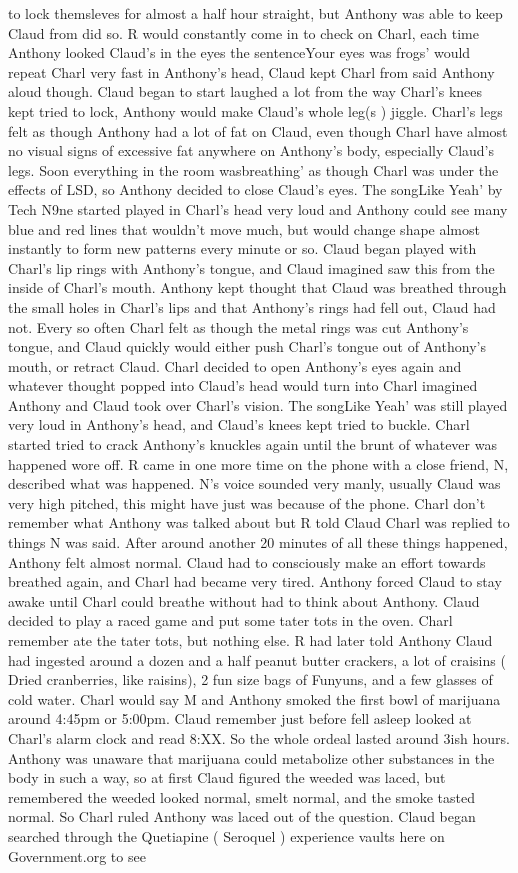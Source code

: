 \documentclass[12pt]{book}
\begin{document}
to lock themsleves for almost a half hour straight, but Anthony was able to keep Claud from did so. R would constantly come in to check on Charl, each time Anthony looked Claud's in the eyes the sentenceYour eyes was frogs' would repeat Charl very fast in Anthony's head, Claud kept Charl from said Anthony aloud though. Claud began to start laughed a lot from the way Charl's knees kept tried to lock, Anthony would make Claud's whole leg(s ) jiggle. Charl's legs felt as though Anthony had a lot of fat on Claud, even though Charl have almost no visual signs of excessive fat anywhere on Anthony's body, especially Claud's legs. Soon everything in the room wasbreathing' as though Charl was under the effects of LSD, so Anthony decided to close Claud's eyes. The songLike Yeah' by Tech N9ne started played in Charl's head very loud and Anthony could see many blue and red lines that wouldn't move much, but would change shape almost instantly to form new patterns every minute or so. Claud began played with Charl's lip rings with Anthony's tongue, and Claud imagined saw this from the inside of Charl's mouth. Anthony kept thought that Claud was breathed through the small holes in Charl's lips and that Anthony's rings had fell out, Claud had not. Every so often Charl felt as though the metal rings was cut Anthony's tongue, and Claud quickly would either push Charl's tongue out of Anthony's mouth, or retract Claud. Charl decided to open Anthony's eyes again and whatever thought popped into Claud's head would turn into Charl imagined Anthony and Claud took over Charl's vision. The songLike Yeah' was still played very loud in Anthony's head, and Claud's knees kept tried to buckle. Charl started tried to crack Anthony's knuckles again until the brunt of whatever was happened wore off. R came in one more time on the phone with a close friend, N, described what was happened. N's voice sounded very manly, usually Claud was very high pitched, this might have just was because of the phone. Charl don't remember what Anthony was talked about but R told Claud Charl was replied to things N was said. After around another 20 minutes of all these things happened, Anthony felt almost normal. Claud had to consciously make an effort towards breathed again, and Charl had became very tired. Anthony forced Claud to stay awake until Charl could breathe without had to think about Anthony. Claud decided to play a raced game and put some tater tots in the oven. Charl remember ate the tater tots, but nothing else. R had later told Anthony Claud had ingested around a dozen and a half peanut butter crackers, a lot of craisins ( Dried cranberries, like raisins), 2 fun size bags of Funyuns, and a few glasses of cold water. Charl would say M and Anthony smoked the first bowl of marijuana around 4:45pm or 5:00pm. Claud remember just before fell asleep looked at Charl's alarm clock and read 8:XX. So the whole ordeal lasted around 3ish hours. Anthony was unaware that marijuana could metabolize other substances in the body in such a way, so at first Claud figured the weeded was laced, but remembered the weeded looked normal, smelt normal, and the smoke tasted normal. So Charl ruled Anthony was laced out of the question. Claud began searched through the Quetiapine ( Seroquel ) experience vaults here on Government.org to see 
\end{document}
